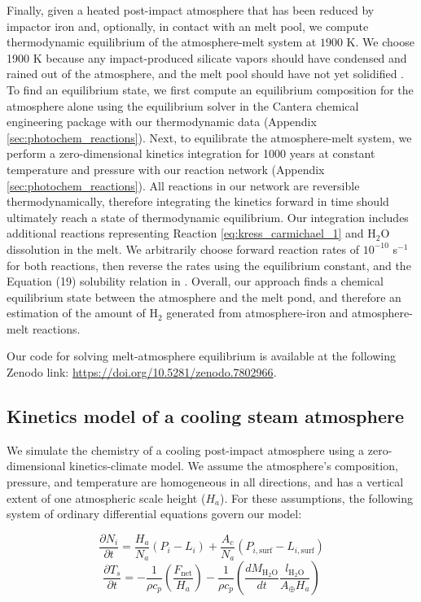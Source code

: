 Finally, given a heated post-impact atmosphere that has been reduced by impactor iron and, optionally, in contact with an melt pool, we compute thermodynamic equilibrium of the atmosphere-melt system at $1900$ K. We choose 1900 K because any impact-produced silicate vapors should have condensed and rained out of the atmosphere, and the melt pool should have not yet solidified \citep{Itcovitz_2022}. To find an equilibrium state, we first compute an equilibrium composition for the atmosphere alone using the equilibrium solver in the Cantera chemical engineering package \citep{Goodwin_2022} with our thermodynamic data (Appendix \ref{sec:photochem_reactions}). Next, to equilibrate the atmosphere-melt system, we perform a zero-dimensional kinetics integration for 1000 years at constant temperature and pressure with our reaction network (Appendix \ref{sec:photochem_reactions}). All reactions in our network are reversible thermodynamically, therefore integrating the kinetics forward in time should ultimately reach a state of thermodynamic equilibrium. Our integration includes additional reactions representing Reaction \ref{eq:kress_carmichael_1} and H$_2$O dissolution in the melt. We arbitrarily choose forward reaction rates of $10^{-10}$ s$^{-1}$ for both reactions, then reverse the rates using the \citet{Kress_1991} equilibrium constant, and the Equation (19) solubility relation in \citet{Itcovitz_2022}. Overall, our approach finds a chemical equilibrium state between the atmosphere and the melt pond, and therefore an estimation of the amount of H$_2$ generated from atmosphere-iron and atmosphere-melt reactions.

Our code for solving melt-atmosphere equilibrium is available at the following Zenodo link: \url{https://doi.org/10.5281/zenodo.7802966}.

\subsection{Kinetics model of a cooling steam atmosphere} \label{sec:kinetics_climate}

We simulate the chemistry of a cooling post-impact atmosphere using a zero-dimensional kinetics-climate model. We assume the atmosphere's composition, pressure, and temperature are homogeneous in all directions, and has a vertical extent of one atmospheric scale height ($H_a$). For these assumptions, the following system of ordinary differential equations govern our model:

\begin{equation} \label{eq:prod_loss}
  \frac{\partial N_i}{\partial t} = \frac{H_a}{N_a} (P_i - L_i) + \frac{A_c}{N_a} (P_{i,\text{surf}} - L_{i,\text{surf}})
\end{equation}
\begin{equation} \label{eq:temp}
  \frac{\partial T_s}{\partial t} = -\frac{1}{\rho c_p} \left(\frac{F_\text{net}}{H_a}\right) - \frac{1}{\rho c_p}\left(\frac{d M_\mathrm{H_2O}}{dt} \frac{l_\mathrm{H_2O}}{A_\oplus H_a}\right) 
\end{equation}

